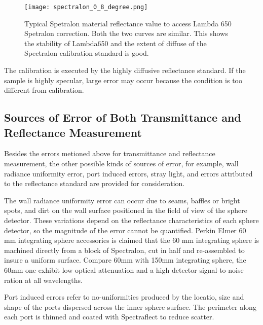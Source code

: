 \begin{figure}
    \centering
    \texttt{[image: spectralon\_0\_8\_degree.png]}
    \caption[Typical Spetralon material reflectance value to access Lambda 650 Spetralon correction]{Typical Spetralon material reflectance value to access Lambda 650 Spetralon correction. Both the two curves are similar. This shows the stability of Lambda650 and the extent of diffuse of the Spectralon calibration standard is good.}
    \label{fig:spectralon_0_8_degree.png}
    \end{figure}


The calibration is executed by the highly diffusive reflectance standard.
If the sample is highly specular, large error may occur because the condition is too different from calibration.


\subsection{Sources of Error of Both Transmittance and Reflectance Measurement}

Besides the errors metioned above for transmittance and reflectance measurement, the other possible kinds of sources of error, for example,
wall radiance uniformity error, port induced errors, stray light, and errors attributed to the reflectance standard are provided
for consideration.

The wall radiance uniformity error can occur due to seams, baffles or bright spots, and dirt on the wall surface
positioned in the field of view of the sphere detector. These variations depend on the reflectance
characteristics of each sphere detector, so the magnitude of the error cannot be quantified.
Perkin Elmer 60 mm integrating sphere accessories is claimed that the 60 mm integrating sphere is machined
directly from a block of Spectralon, cut in half and
re-assembled to insure a uniform surface. Compare 60mm with 150mm integrating sphere, the 60mm one exhibit low optical
attenuation and a high detector signal-to-noise ration at all wavelengths.

Port induced errors refer to no-uniformities produced by the locatio, size and shape
of the ports dispersed across the inner sphere surface. The perimeter along each
port is thinned and coated with Spectraflect to reduce scatter.

